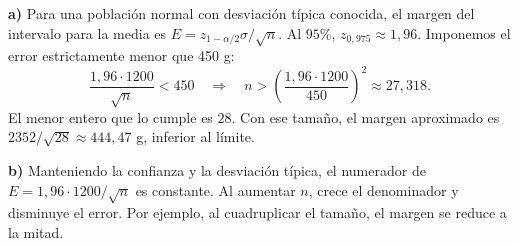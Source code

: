 \textbf{a)} Para una población normal con desviación típica conocida, el margen del intervalo para la media es $E=z_{1-\alpha/2}\sigma/\sqrt n$. Al $95\%$, $z_{0{,}975}\approx1{,}96$. Imponemos el error estrictamente menor que 450 g:
\[
 \frac{1{,}96\cdot1200}{\sqrt n}<450
 \quad\Longrightarrow\quad
 n>\left(\frac{1{,}96\cdot1200}{450}\right)^2
 \approx27{,}318.
\]
El menor entero que lo cumple es $\boxed{28}$. Con ese tamaño, el margen aproximado es $2352/\sqrt{28}\approx444{,}47$ g, inferior al límite.

\textbf{b)} Manteniendo la confianza y la desviación típica, el numerador de $E=1{,}96\cdot1200/\sqrt n$ es constante. Al aumentar $n$, crece el denominador y disminuye el error. Por ejemplo, al cuadruplicar el tamaño, el margen se reduce a la mitad.
